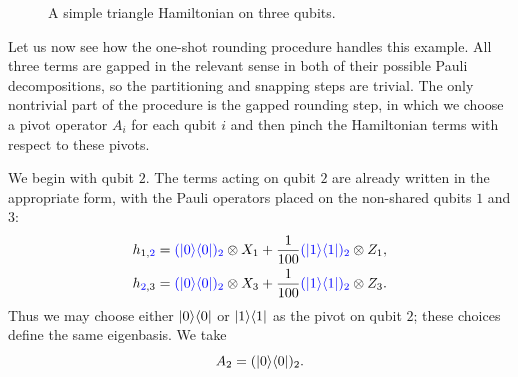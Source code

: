 \documentclass[11pt]{article}
\newcommand{\blue}[1]{{\color{blue}#1}}
\theoremstyle{plain}
\newcommand{\proj}[1]{\ket{#1}\!\bra{#1}}
\begin{document}
\begin{figure}[t]
\centering
{}
\caption{A simple triangle Hamiltonian on three qubits.}
\label{fig:triangle2}
\end{figure}

Let us now see how the one-shot rounding procedure handles this example.
All three terms are gapped in the relevant sense in both of their possible
Pauli decompositions, so the partitioning and snapping steps are trivial.
The only nontrivial part of the procedure is the gapped rounding step, in
which we choose a pivot operator $A_i$ for each qubit $i$ and then pinch
the Hamiltonian terms with respect to these pivots.

We begin with qubit $2$.  The terms acting on qubit $2$ are already
written in the appropriate form, with the Pauli operators placed on the
non-shared qubits $1$ and $3$:
\begin{align*}
    h_{1,\blue{2}}
        &= \blue{(\proj{0})_2} \otimes X_1
        + \frac{1}{100} \blue{(\proj{1})_2} \otimes Z_1, \\
    h_{\blue{2},3}
        &= \blue{(\proj{0})_2} \otimes X_3
        + \frac{1}{100} \blue{(\proj{1})_2} \otimes Z_3.
\end{align*}
Thus we may choose either $\proj{0}$ or $\proj{1}$ as the pivot on qubit
$2$; these choices define the same eigenbasis.  We take
\[
    A_2 = (\proj{0})_2 .
\]
\end{document}
